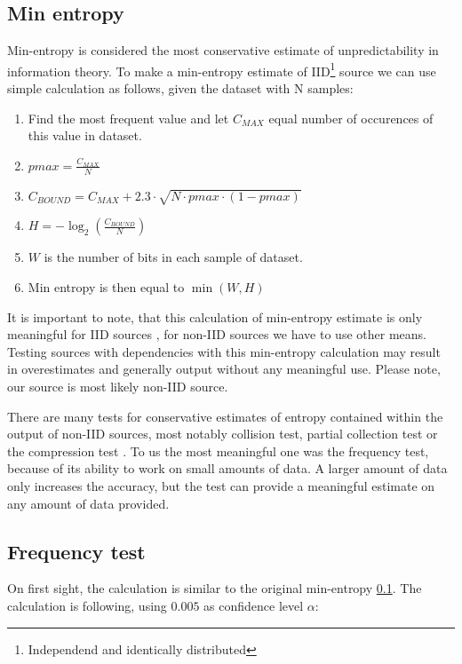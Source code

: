 \documentclass[
  print, %
  Table,   %
  nolof,     %
  nolot,     %
           oneside
]{fithesis3}
\begin{document}
  \subsection{Min entropy}\label{par:min}
Min-entropy \cite{barker2012recommendation} is considered the most conservative estimate of unpredictability in information theory. To make a min-entropy estimate of IID\footnote{Independend and identically distributed} source we can use simple calculation as follows, given the dataset with N samples:


\begin{enumerate}
  \item Find the most frequent value and let $C_{MAX}$ equal number of occurences of this value in dataset.
  \item $pmax = \frac{C_{MAX}}{N}$
  \item $C_{BOUND}=C_{MAX} + 2.3 \cdot \sqrt{N \cdot pmax \cdot ( 1- pmax)}$
  \item $H = - \log_2 (\frac{C_{BOUND}}{N}) $
  \item $W$ is the number of bits in each sample of dataset.
  \item Min entropy is then equal to $\min(W, H)$

\end{enumerate}

It is important to note, that this calculation of min-entropy estimate is only meaningful for IID sources \cite{barker2012recommendation}, for non-IID sources we have to use other means. Testing sources with dependencies with this min-entropy calculation may result in overestimates and generally output without any meaningful use. Please note, our source is most likely non-IID source.

There are many tests for conservative estimates of entropy contained within the output of non-IID sources, most notably collision test, partial collection test or the compression test \cite{barker2012recommendation}. To us the most meaningful one was the frequency test\cite{barker2012recommendation}, because of its ability to work on small amounts of data. A larger amount of data only increases the accuracy, but the test can provide a meaningful estimate on any amount of data provided.

\subsection{Frequency test}\label{par:freq}
  On first sight, the calculation is similar to the original min-entropy \ref{par:min}. The calculation is following, using $0.005$ as confidence level $\alpha$:
\end{document}
